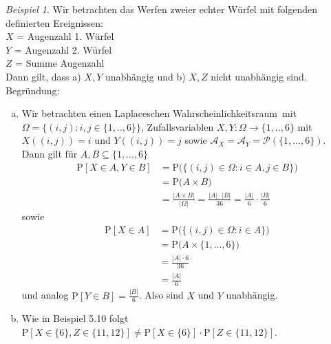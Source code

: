 \documentclass[a4paper,12pt,fleqn]{scrartcl}
\newcommand{\m}[1]{\mathcal{ #1 }}
\newcommand{\p}[1]{\text{P(} #1 \text{)}}
\newcommand{\WR}{Wahrscheinlichkeitsraum}
\theoremstyle{definition}
\theoremstyle{plain}
\theoremstyle{remark}
\newtheorem{beispiel}[definition]{Beispiel}
\begin{document}
\begin{beispiel}
Wir betrachten das Werfen zweier echter Würfel mit folgenden definierten Ereignissen: \\
$X$ = \glqq Augenzahl 1. Würfel\grqq \\
$Y$ = \glqq Augenzahl 2. Würfel\grqq \\
$Z$ = \glqq Summe Augenzahl\grqq \\
Dann gilt, dass a) $X, Y$ unabhängig und b) $X, Z$ nicht unabhängig sind.\\
Begründung: 
\begin{enumerate}[a)]
\item Wir betrachten einen Laplaceschen \WR \, mit $ \Omega = \{ ( i,j) : i,j \in \{ 1,..,6 \} \}$, Zufallsvariablen $X, Y: \Omega \rightarrow \{ 1,..,6 \}$ mit $X((i,j)) = i$ und $Y((i,j))=j$ sowie $\m{A}_X = \m{A}_Y = \m{P}( \{ 1,...,6 \} )$. \\
Dann gilt für $A, B \subseteq \{1,...,6 \} $
\begin{align*}
\text{P}[X \in A , Y \in B] &= \p{\{ (i,j) \in \Omega : i \in A , j \in B \}} \\
&= \p{A \times B} \\
&= \frac{| A \times B |}{| \Omega  |} = \frac{|A| \cdot |B|}{36} = \frac{|A|}{6} \cdot \frac{|B|}{6}
\end{align*} 
sowie 
\begin{align*}
\text{P}[X \in A] &= \p{ \{ (i,j) \in \Omega : i \in A \}} \\
&= \p{A \times \{ 1, \ldots ,6 \} } \\
&= \frac{|A| \cdot 6}{36} \\
&= \frac{|A|}{6}
\end{align*}
und analog $\text{P}[Y \in B] = \frac{|B|}{6}$. Also sind $X$ und $Y$ unabhängig.
\item Wie in Beispiel 5.10 folgt $\text{P}[ X \in \{ 6 \} , Z \in \{ 11 , 12 \} ] \neq \text{P}[X \in \{ 6 \} ] \cdot \text{P}[Z \in \{ 11 , 12 \} ]$.
\end{enumerate}
\end{beispiel}
\end{document}
